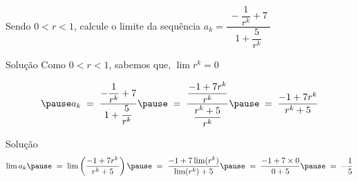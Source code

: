\begin{question}
  Sendo $0<r<1$, calcule o limite da sequência
  \(
    a_k = \dfrac{\;-\dfrac{1}{r^k}+7\;}{ 1 + \dfrac{5}{r^k}}
  \)
\end{question}

\begin{resolution}{Solução}
  Como $0<r<1$, sabemos que, \(\lim r^k=0\)

  \[
    \pause
    a_k
    \;=\; \frac{-\dfrac{1}{r^k}+7}{1+ \dfrac{5}{r^k}}
    \pause
    \;=\; \frac{\dfrac{-1+7r^k}{r^k}}{\dfrac{r^k + 5}{r^k}}
    \pause
    \;=\; \frac{-1+7r^k}{r^k+5}
  \]
\end{resolution}


\begin{resolution}{Solução}
  \[
    \lim a_k
    \pause
    \;=\; \lim \left(\frac{-1+7r^k}{r^k+5}\right)
    \pause
    \;=\; \dfrac{-1+7\lim(r^k)}{\lim(r^k) + 5}
    \pause
    \;=\; \frac{-1+7\times 0}{0+5}
    \pause
    \;=\;-\frac{1}{5}
  \]
\end{resolution}

